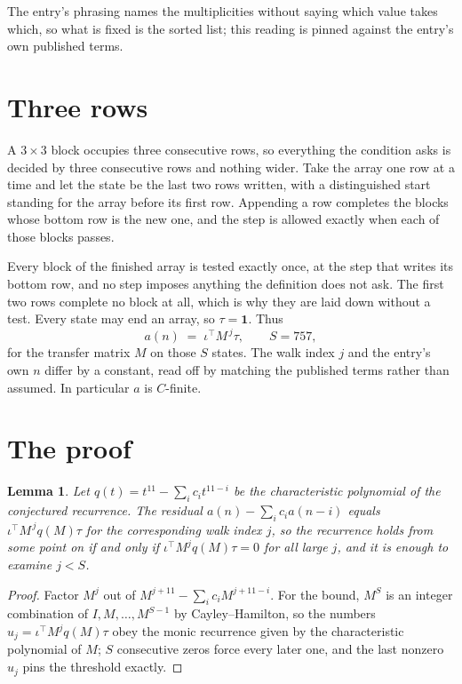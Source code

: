\documentclass[11pt,a4paper]{article}
\theoremstyle{plain}
\newtheorem{lemma}[theorem]{Lemma}
\theoremstyle{definition}
\begin{document}
The entry's phrasing names the multiplicities without saying which value takes which, so what is fixed is the sorted list; this reading is pinned against the entry's own published terms.

\section{Three rows}

A $3\times3$ block occupies three consecutive rows, so everything the condition asks is decided
by three consecutive rows and nothing wider. Take the array one row at a time and let the state
be the last two rows written, with a distinguished start standing for the array before its
first row. Appending a row completes the blocks whose bottom row is the new one, and the step
is allowed exactly when each of those blocks passes.

Every block of the finished array is tested exactly once, at the step that writes its bottom
row, and no step imposes anything the definition does not ask. The first two rows complete no
block at all, which is why they are laid down without a test. Every state may end an array, so
$\tau=\mathbf{1}$. Thus
\[
a(n)\;=\;\iota^{\!\top}M^{\,j}\tau ,\qquad S=757,
\]
for the transfer matrix $M$ on those $S$ states. The walk index $j$ and the entry's own $n$
differ by a constant, read off by matching the published terms rather than assumed. In
particular $a$ is $C$-finite.

\section{The proof}

\begin{lemma}\label{lem:crit}
Let $q(t)=t^{11}-\sum_i c_it^{11-i}$ be the characteristic polynomial of the
conjectured recurrence. The residual $a(n)-\sum_ic_ia(n-i)$ equals
$\iota^{\!\top}M^{\,j}q(M)\tau$ for the corresponding walk index $j$, so the recurrence
holds from some point on if and only if $\iota^{\!\top}M^{j}q(M)\tau=0$ for all large $j$,
and it is enough to examine $j<S$.
\end{lemma}

\begin{proof}
Factor $M^{j}$ out of $M^{j+11}-\sum_ic_iM^{j+11-i}$. For the bound, $M^{S}$
is an integer combination of $I,M,\dots,M^{S-1}$ by Cayley--Hamilton, so the numbers
$u_j=\iota^{\!\top}M^{j}q(M)\tau$ obey the monic recurrence given by the characteristic
polynomial of $M$; $S$ consecutive zeros force every later one, and the last nonzero $u_j$
pins the threshold exactly.
\end{proof}
\end{document}

